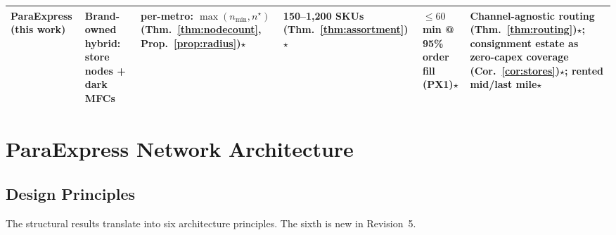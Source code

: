 \documentclass[10pt,twocolumn,letterpaper]{article}
\theoremstyle{definition}
\begin{document}
\begin{table}[t]
\begin{tabular}{@{}p{1.9cm}p{2.6cm}p{2.9cm}p{2.0cm}p{2.2cm}p{4.0cm}@{}}
\midrule
\textbf{ParaExpress (this work)} & \textbf{Brand-owned hybrid}: store nodes + dark MFCs & per-metro: $\max(n_{\min},n^\star)$ (Thm.~\ref{thm:nodecount}, Prop.~\ref{prop:radius})$\star$ & 150--1,200 SKUs (Thm.~\ref{thm:assortment})$\star$ & $\le 60$\,min @ 95\% order fill (PX1)$\star$ & Channel-agnostic routing (Thm.~\ref{thm:routing})$\star$; consignment estate as zero-capex coverage (Cor.~\ref{cor:stores})$\star$; rented mid/last mile$\star$\\
\bottomrule
\end{tabular}
\end{table}

\section{ParaExpress Network Architecture}\label{sec:arch}

\subsection{Design Principles}
The structural results translate into six architecture principles. The sixth is new in Revision~5.
\end{document}
